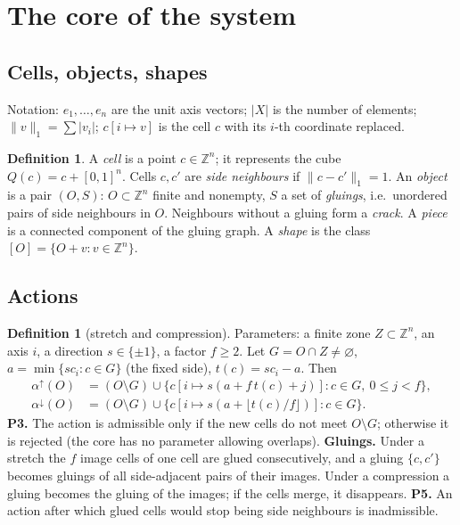 \documentclass[11pt,a4paper]{article}
\theoremstyle{plain}
\theoremstyle{definition}
\newtheorem{definition}[theorem]{Definition}
\theoremstyle{remark}
\newcommand{\Z}{\mathbb{Z}}
\begin{document}
\section{The core of the system}\label{sec:core}

\subsection{Cells, objects, shapes}

Notation: $e_1,\dots,e_n$ are the unit axis vectors; $|X|$ is the number of elements; $\|v\|_1=\sum|v_i|$; $c[i\mapsto v]$ is the cell $c$ with its $i$-th coordinate replaced.

\begin{definition}
A \emph{cell} is a point $c\in\Z^n$; it represents the cube $Q(c)=c+[0,1]^n$. Cells $c,c'$ are \emph{side neighbours} if $\|c-c'\|_1=1$. An \emph{object} is a pair $(O,S)$: $O\subset\Z^n$ finite and nonempty, $S$ a set of \emph{gluings}, i.e.\ unordered pairs of side neighbours in $O$. Neighbours without a gluing form a \emph{crack}. A \emph{piece} is a connected component of the gluing graph. A \emph{shape} is the class $[O]=\{O+v: v\in\Z^n\}$.
\end{definition}

\subsection{Actions}\label{sec:actions}

\begin{definition}[stretch and compression]\label{def:alpha}
Parameters: a finite zone $Z\subset\Z^n$, an axis $i$, a direction $s\in\{\pm1\}$, a factor $f\ge2$. Let $G=O\cap Z\ne\varnothing$, $a=\min\{sc_i:c\in G\}$ (the fixed side), $t(c)=sc_i-a$. Then
\begin{align*}
\alpha^{\uparrow}(O)&=(O\setminus G)\cup\{c[i\mapsto s(a+f\,t(c)+j)]: c\in G,\ 0\le j<f\},\\
\alpha^{\downarrow}(O)&=(O\setminus G)\cup\{c[i\mapsto s(a+\lfloor t(c)/f\rfloor)]: c\in G\}.
\end{align*}
\textbf{P3.} The action is admissible only if the new cells do not meet $O\setminus G$; otherwise it is rejected (the core has no parameter allowing overlaps).
\textbf{Gluings.} Under a stretch the $f$ image cells of one cell are glued consecutively, and a gluing $\{c,c'\}$ becomes gluings of all side-adjacent pairs of their images. Under a compression a gluing becomes the gluing of the images; if the cells merge, it disappears.
\textbf{P5.} An action after which glued cells would stop being side neighbours is inadmissible.
\end{definition}
\end{document}
